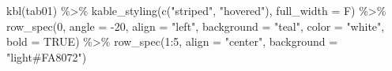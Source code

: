 \documentclass[
]{book}
\newenvironment{Shaded}{\begin{snugshade}}{\end{snugshade}}
\newcommand{\AttributeTok}[1]{\textcolor[rgb]{0.77,0.63,0.00}{#1}}
\newcommand{\ConstantTok}[1]{\textcolor[rgb]{0.00,0.00,0.00}{#1}}
\newcommand{\DecValTok}[1]{\textcolor[rgb]{0.00,0.00,0.81}{#1}}
\newcommand{\FunctionTok}[1]{\textcolor[rgb]{0.00,0.00,0.00}{#1}}
\newcommand{\NormalTok}[1]{#1}
\newcommand{\SpecialCharTok}[1]{\textcolor[rgb]{0.00,0.00,0.00}{#1}}
\newcommand{\StringTok}[1]{\textcolor[rgb]{0.31,0.60,0.02}{#1}}
\begin{document}
\begin{Shaded}
\begin{Highlighting}[]
\FunctionTok{kbl}\NormalTok{(tab01) }\SpecialCharTok{\%\textgreater{}\%}
  \FunctionTok{kable\_styling}\NormalTok{(}\FunctionTok{c}\NormalTok{(}\StringTok{"striped"}\NormalTok{, }\StringTok{"hovered"}\NormalTok{), }\AttributeTok{full\_width =}\NormalTok{ F) }\SpecialCharTok{\%\textgreater{}\%}
  \FunctionTok{row\_spec}\NormalTok{(}\DecValTok{0}\NormalTok{, }\AttributeTok{angle =} \SpecialCharTok{{-}}\DecValTok{20}\NormalTok{, }\AttributeTok{align =} \StringTok{"left"}\NormalTok{, }\AttributeTok{background =} \StringTok{"teal"}\NormalTok{,}
    \AttributeTok{color =} \StringTok{"white"}\NormalTok{, }\AttributeTok{bold =} \ConstantTok{TRUE}\NormalTok{) }\SpecialCharTok{\%\textgreater{}\%}
  \FunctionTok{row\_spec}\NormalTok{(}\DecValTok{1}\SpecialCharTok{:}\DecValTok{5}\NormalTok{, }\AttributeTok{align =} \StringTok{"center"}\NormalTok{, }\AttributeTok{background =} \StringTok{"light\#FA8072"}\NormalTok{)}
\end{Highlighting}
\end{Shaded}
\end{document}
